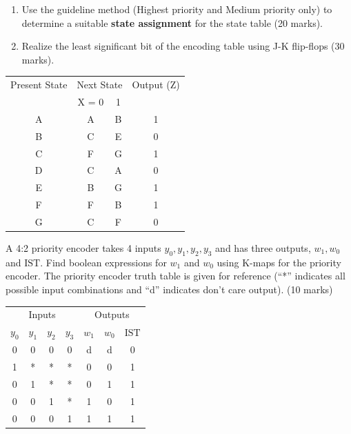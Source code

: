 \begin{prob}
  \begin{enumerate}
  \item
    Use the guideline method (Highest priority and Medium priority only) to determine a suitable \textbf{state assignment} for the state table (20 marks).
  \item Realize the least significant bit of the encoding table using J-K flip-flops (30 marks).
  \end{enumerate} 

  \begin{tabular}{c|cc|c}
    \toprule
    Present State & \multicolumn{2}{c|}{Next State} & Output (Z)\\
                  & X = 0 & 1 & \\
                  \midrule
    A & A & B & 1\\
    B & C & E & 0\\
    C & F & G & 1\\
    D & C & A & 0\\
    E & B & G & 1\\
    F & F & B & 1\\
    G & C & F & 0\\
    \bottomrule
  \end{tabular}
\end{prob}

\begin{prob}
  A 4:2 priority encoder takes 4 inputs $y_0, y_1, y_2, y_3$ and has three outputs, $w_1, w_0$ and $\text{IST}$. Find boolean expressions for $w_1$ and $w_0$ using K-maps for the priority encoder. The priority encoder truth table is given for reference (``*'' indicates all possible input combinations and ``d'' indicates don't care output). (10 marks) \\
  \begin{tabular}{cccc|ccc}
    \toprule
    \multicolumn{4}{c|}{Inputs} & \multicolumn{3}{c}{Outputs}\\
    $y_0$ & $y_1$ & $y_2$ & $y_3$ & $w_1$ & $w_0$ & $\text{IST}$ \\
    \midrule
    0 & 0 & 0 & 0 & d & d & 0\\
    1 & * & * & * & 0 & 0 & 1\\
    0 & 1 & * & * & 0 & 1 & 1\\
    0 & 0 & 1 & * & 1 & 0 & 1\\
    0 & 0 & 0 & 1 & 1 & 1 & 1\\
    \midrule
  \end{tabular}
\end{prob}

